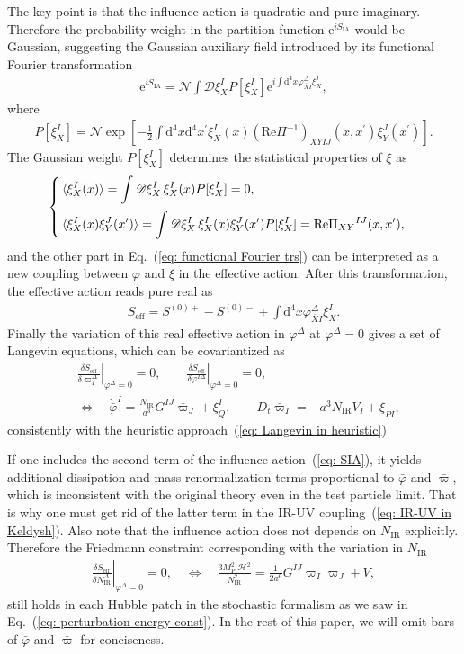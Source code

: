 \documentclass[a4paper,11pt]{article}
\newcommand{\var}[2]{\frac{\delta #1}{\delta #2}}
\newcommand{\dd}{\mathrm{d}}
\newcommand{\ee}{\mathrm{e}}
\newcommand{\Mpl}{M_\text{Pl}}
\newcommand{\IR}{\text{IR}}
\renewcommand{\Re}{\mathrm{Re}}
\renewcommand{\Im}{\mathrm{Im}}
\newcommand{\dps}{\displaystyle}
\newcommand{\SIA}{S_\text{IA}}
\newcommand{\eff}{\text{eff}}
\newcommand{\scrD}{\mathscr{D}}
\newcommand{\calH}{\mathcal{H}}
\newcommand{\calN}{\mathcal{N}}
\newcommand{\bae}[1]{\begin{align} #1 \end{align}}
\newcommand{\bce}[1]{\begin{cases} #1 \end{cases}}
\begin{document}
The key point is that the influence action is quadratic and pure imaginary. Therefore the probability weight in the partition function
$\ee^{i\SIA}$ would be Gaussian, suggesting the Gaussian auxiliary field introduced by its functional Fourier transformation~\cite{Caldeira:1982iu,Grabert:1988yt}
\bae{\label{eq: functional Fourier trs}
	\ee^{i\SIA}=\calN\int\scrD\xi_X^IP[\xi_X^I]\ee^{i\int\dd^4x\varphi_{\bar{X}I}^\Delta\xi_X^I},
}
where
\bae{
	P[\xi_X^I]=\calN\exp\left[-\frac{1}{2}\int\dd^4x\dd^4x^\prime\xi_{X}^I(x)(\Re\Pi^{-1})_{XYIJ}(x,x^\prime)\xi_Y^J(x^\prime)\right].
}
The Gaussian weight $P[\xi_X^I]$ determines the statistical properties of $\xi$ as
\bae{
	\bce{
		\dps
		\braket{\xi_X^I(x)}=\int\scrD\xi_X^I\,\xi_X^I(x)P[\xi_X^I]=0, \\[10pt]
		\dps
		\braket{\xi_X^I(x)\xi_{Y}^J(x^\prime)}=\int\scrD\xi_X^I\,\xi_X^I(x)\xi_{Y}^J(x^\prime)P[\xi_X^I]=\Re\Pi_{XY}{}^{IJ}(x,x^\prime),
	}
}
and the other part in Eq.~(\ref{eq: functional Fourier trs}) can be interpreted as a new coupling between $\varphi$ and $\xi$ 
in the effective action.
After this transformation, the effective action reads pure real as
\bae{\label{eq: Seff}
	S_\eff=S^{(0)+}-S^{(0)-}+\int\dd^4x\varphi_{\bar{X}I}^\Delta\xi_X^I.
}
Finally the variation of this real effective action in $\varphi^\Delta$ at $\varphi^\Delta=0$ gives a set of Langevin equations, which can be covariantized as
\bae{\label{eq: covariant Langevin}
	&\left.\var{S_\eff}{\varpi_I^\Delta}\right|_{\varphi^\Delta=0}=0, \quad\quad \left.\var{S_\eff}{\varphi^{I\Delta}}\right|_{\varphi^\Delta=0}=0, \nonumber \\
    &\Leftrightarrow \quad \dot{\bar{\varphi}}^I=\frac{N_\IR}{a^3}G^{IJ}\bar{\varpi}_J+\xi_Q^I, \quad\quad D_t\bar{\varpi}_I=-a^3N_\IR V_I+\xi_{\tilde{P}I},
}
consistently with the heuristic approach~(\ref{eq: Langevin in heuristic})

If one includes the second term of the influence action~(\ref{eq: SIA}), it yields additional dissipation and mass renormalization terms proportional to
$\bar{\varphi}$ and $\bar{\varpi}$, which is inconsistent with the original theory even in the test particle limit.
That is why one must get rid of the latter term in the IR-UV coupling~(\ref{eq: IR-UV in Keldysh}).
Also note that the influence action does not depends on $N_\IR$ explicitly. 
Therefore the Friedmann constraint corresponding with the variation in $N_\IR$
\bae{\label{eq: Friedmann eq}
	\left.\var{S_\eff}{N_\IR^\Delta}\right|_{\varphi^\Delta=0}=0, \quad \Leftrightarrow \quad 
	\frac{3\Mpl^2\calH^2}{N_\IR^2}=\frac{1}{2a^6}G^{IJ}\bar{\varpi}_I\bar{\varpi}_J+V,
}
still holds in each Hubble patch in the stochastic formalism as we saw in Eq.~(\ref{eq: perturbation energy const}).
In the rest of this paper, we will omit bars of $\bar{\varphi}$ and $\bar{\varpi}$ for conciseness.
\end{document}
